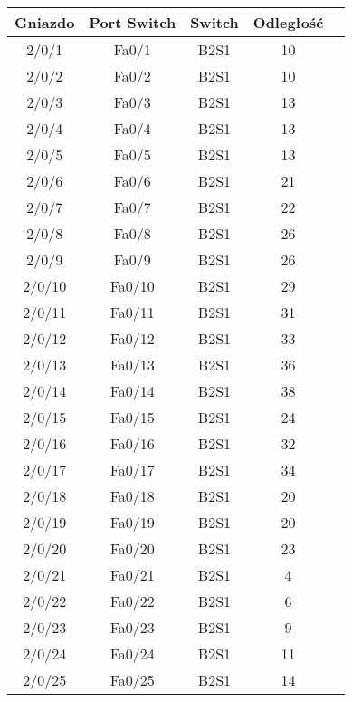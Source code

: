 \begin{center}
    \begin{longtable}{|c|c|c|c|c|}
    \hline
    Gniazdo & Port Switch & Switch & Odległość \\ \hline
	2/0/1 & Fa0/1 & B2S1 & 10 \\ \hline
	2/0/2 & Fa0/2 & B2S1 & 10 \\ \hline
	2/0/3 & Fa0/3 & B2S1 & 13 \\ \hline
	2/0/4 & Fa0/4 & B2S1 & 13 \\ \hline
	2/0/5 & Fa0/5 & B2S1 & 13 \\ \hline
	2/0/6 & Fa0/6 & B2S1 & 21 \\ \hline
	2/0/7 & Fa0/7 & B2S1 & 22 \\ \hline
	2/0/8 & Fa0/8 & B2S1 & 26 \\ \hline
	2/0/9 & Fa0/9 & B2S1 & 26 \\ \hline
	2/0/10 & Fa0/10 & B2S1 & 29 \\ \hline
	2/0/11 & Fa0/11 & B2S1 & 31 \\ \hline
	2/0/12 & Fa0/12 & B2S1 & 33 \\ \hline
	2/0/13 & Fa0/13 & B2S1 & 36 \\ \hline
	2/0/14 & Fa0/14 & B2S1 & 38 \\ \hline
	2/0/15 & Fa0/15 & B2S1 & 24 \\ \hline
	2/0/16 & Fa0/16 & B2S1 & 32 \\ \hline
	2/0/17 & Fa0/17 & B2S1 & 34 \\ \hline
	2/0/18 & Fa0/18 & B2S1 & 20 \\ \hline
	2/0/19 & Fa0/19 & B2S1 & 20 \\ \hline
	2/0/20 & Fa0/20 & B2S1 & 23 \\ \hline
	2/0/21 & Fa0/21 & B2S1 & 4 \\ \hline
	2/0/22 & Fa0/22 & B2S1 & 6 \\ \hline
	2/0/23 & Fa0/23 & B2S1 & 9 \\ \hline
	2/0/24 & Fa0/24 & B2S1 & 11 \\ \hline
	2/0/25 & Fa0/25 & B2S1 & 14 \\ \hline
    \end{longtable}
\end{center}

